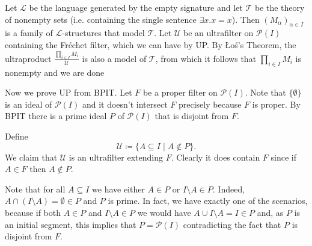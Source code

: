 \documentclass{article}
\theoremstyle{theorem}
\begin{document}
\begin{enumerate}[leftmargin=*]
\begin{enumerate}
				Let $\mathcal{L}$ be the language generated by the empty signature and let $\mathcal{T}$ be the theory of nonempty sets (i.e. containing the single sentence $\exists x. x=x$). Then $(M_{\alpha})_{\alpha \in I}$ is a family of $\mathcal{L}$-structures that model $\mathcal{T}$. Let $\mathcal{U}$ be an ultrafilter on $\mathcal{P}(I)$ containing the Fréchet filter, which we can have by UP. By \L o\'s's Theorem, the ultraproduct $\frac{\prod_{i\in I}M_i}{\mathcal{U}}$ is also a model of $\mathcal{T}$, from which it follows that $\prod_{i\in I}M_i$ is nonempty and we are done
				
				Now we prove UP from BPIT. Let $F$ be a proper filter on $\mathcal{P}(I)$. Note that $\{\emptyset\}$ is an ideal of $\mathcal{P}(I)$ and it doesn't intersect $F$ precisely because $F$ is proper. By BPIT there is a prime ideal $P$ of $\mathcal{P}(I)$ that is disjoint from $F$. 
				
				Define
				\[
					\mathcal{U} \coloneqq \{A \subseteq I \mid A \notin P\}.
				\]
				We claim that $\mathcal{U}$ is an ultrafilter extending $F$. Clearly it does contain $F$ since if $A\in F$ then $A\notin P$.
				
				Note that for all $A\subseteq I$ we have either $A\in P$ or $I\setminus A\in P$. Indeed, $A \cap (I\setminus A) = \emptyset\in P$ and $P$ is prime. In fact, we have exactly one of the scenarios, because if both $A\in P$ and $I\setminus A\in P$ we would have $A\cup I\setminus A = I \in P$ and, as $P$ is an initial segment, this implies that $P=\mathcal{P}(I)$ contradicting the fact that $P$ is disjoint from $F$.
				

\end{enumerate}
\end{enumerate}
\end{document}
